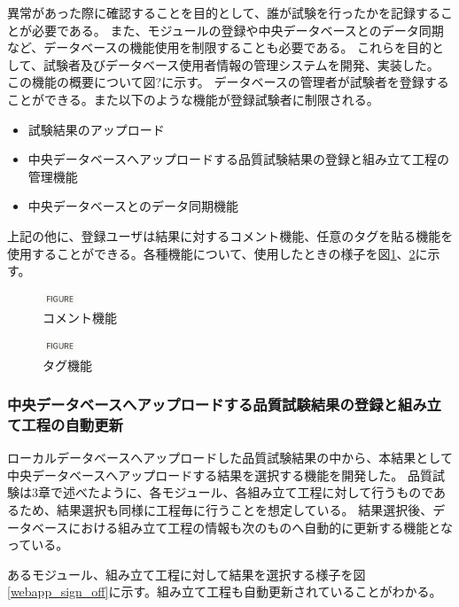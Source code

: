 異常があった際に確認することを目的として、誰が試験を行ったかを記録することが必要である。
また、モジュールの登録や中央データベースとのデータ同期など、データベースの機能使用を制限することも必要である。
これらを目的として、試験者及びデータベース使用者情報の管理システムを開発、実装した。
この機能の概要について図?に示す。
データベースの管理者が試験者を登録することができる。また以下のような機能が登録試験者に制限される。

\begin{itemize}
  \item 試験結果のアップロード
  \item 中央データベースへアップロードする品質試験結果の登録と組み立て工程の管理機能
  \item 中央データベースとのデータ同期機能
\end{itemize}

上記の他に、登録ユーザは結果に対するコメント機能、任意のタグを貼る機能を使用することができる。各種機能について、使用したときの様子を図\ref{webapp_comment}、\ref{webapp_tag}に示す。

\begin{figure}[bpt]\centering
\includegraphics[width=1cm]{figure}
\caption[コメント機能]{コメント機能}
\label{webapp_comment}
\end{figure}

\begin{figure}[bpt]\centering
\includegraphics[width=1cm]{figure}
\caption[タグ機能]{タグ機能}
\label{webapp_tag}
\end{figure}

\subsubsection{中央データベースへアップロードする品質試験結果の登録と組み立て工程の自動更新}
ローカルデータベースへアップロードした品質試験結果の中から、本結果として中央データベースへアップロードする結果を選択する機能を開発した。
品質試験は3章で述べたように、各モジュール、各組み立て工程に対して行うものであるため、結果選択も同様に工程毎に行うことを想定している。
結果選択後、データベースにおける組み立て工程の情報も次のものへ自動的に更新する機能となっている。

あるモジュール、組み立て工程に対して結果を選択する様子を図\ref{webapp_sign_off}に示す。組み立て工程も自動更新されていることがわかる。


